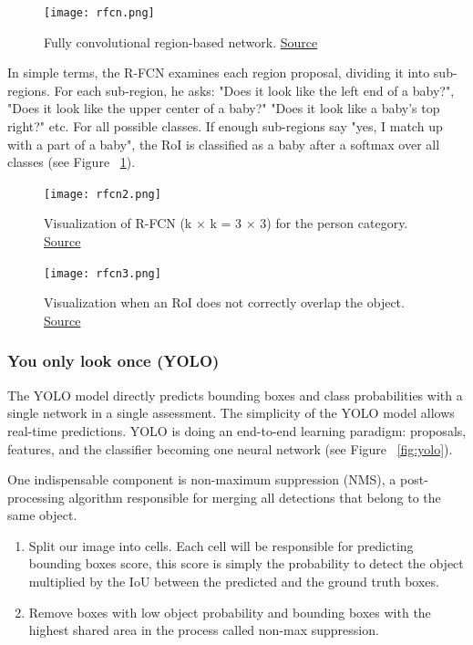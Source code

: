 \begin{figure}[H]
    \centering
    \texttt{[image: rfcn.png]}
	\caption[R-FCN]{Fully convolutional region-based network. \href{https://arxiv.org/pdf/1605.06409.pdf}{Source}}
\end{figure}

In simple terms, the R-FCN examines each region proposal, dividing it into sub-regions.
For each sub-region, he asks: "Does it look like the left end of a baby?", "Does it look like the upper center of a baby?" "Does it look like a baby's top right?" etc. For all possible classes.  If enough sub-regions say "yes, I match up with a part of a baby", the RoI is classified as a baby after a softmax over all classes (see Figure ~\ref{fig:rfcnbaby}).


\begin{figure}[H]
    \centering
    \texttt{[image: rfcn2.png]}
	\caption[R-FCN2]{Visualization of R-FCN (k × k = 3 × 3) for the person category.  \href{https://arxiv.org/pdf/1605.06409.pdf}{Source}}
	\label{fig:rfcnbaby}
\end{figure}

\begin{figure}[H]
    \centering
    \texttt{[image: rfcn3.png]}
	\caption[R-FCN3]{Visualization when an RoI does not correctly overlap the object.  \href{https://arxiv.org/pdf/1605.06409.pdf}{Source}}
\end{figure}



\pagebreak\subsubsection{You only look once (YOLO)}
The YOLO\cite{yolo} model directly predicts bounding boxes and class probabilities with a single network in a single assessment. The simplicity of the YOLO model allows real-time predictions.
YOLO is doing an end-to-end learning paradigm: proposals, features, and the classifier becoming one neural network (see Figure ~\ref{fig:yolo}). 

One indispensable component is non-maximum suppression (NMS), a post-processing algorithm responsible for merging all detections that belong to the same object. 

\begin{enumerate}
    \item Split our image into cells. Each cell will be responsible for predicting bounding boxes score, this score is simply the probability to detect the object multiplied by the IoU between the predicted and the ground truth boxes.
    \item Remove boxes with low object probability and bounding boxes with the highest shared area in the process called non-max suppression.
\end{enumerate}


